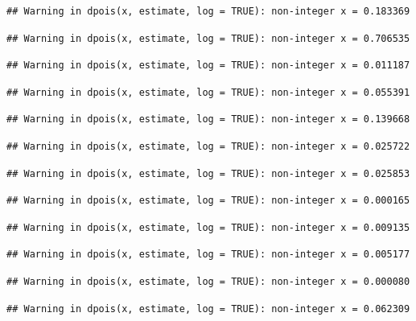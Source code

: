 \documentclass[]{article}
\begin{document}
\begin{verbatim}
## Warning in dpois(x, estimate, log = TRUE): non-integer x = 0.183369
\end{verbatim}

\begin{verbatim}
## Warning in dpois(x, estimate, log = TRUE): non-integer x = 0.706535
\end{verbatim}

\begin{verbatim}
## Warning in dpois(x, estimate, log = TRUE): non-integer x = 0.011187
\end{verbatim}

\begin{verbatim}
## Warning in dpois(x, estimate, log = TRUE): non-integer x = 0.055391
\end{verbatim}

\begin{verbatim}
## Warning in dpois(x, estimate, log = TRUE): non-integer x = 0.139668
\end{verbatim}

\begin{verbatim}
## Warning in dpois(x, estimate, log = TRUE): non-integer x = 0.025722
\end{verbatim}

\begin{verbatim}
## Warning in dpois(x, estimate, log = TRUE): non-integer x = 0.025853
\end{verbatim}

\begin{verbatim}
## Warning in dpois(x, estimate, log = TRUE): non-integer x = 0.000165
\end{verbatim}

\begin{verbatim}
## Warning in dpois(x, estimate, log = TRUE): non-integer x = 0.009135
\end{verbatim}

\begin{verbatim}
## Warning in dpois(x, estimate, log = TRUE): non-integer x = 0.005177
\end{verbatim}

\begin{verbatim}
## Warning in dpois(x, estimate, log = TRUE): non-integer x = 0.000080
\end{verbatim}

\begin{verbatim}
## Warning in dpois(x, estimate, log = TRUE): non-integer x = 0.062309
\end{verbatim}
\end{document}

